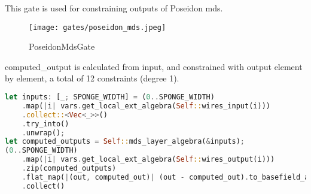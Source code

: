 
\hspace*{\fill}

\indent This gate is used for constraining outputs of Poseidon mds.

\begin{figure}[!ht]
    \centering
    \texttt{[image: gates/poseidon\_mds.jpeg]}
    \caption{PoseidonMdsGate}
    \label{fig:poseidon-mds}
\end{figure}

computed\_output is calculated from input, and constrained with output element by element, a total of 12 constraints (degree 1).
\begin{lstlisting}[language=rust]
let inputs: [_; SPONGE_WIDTH] = (0..SPONGE_WIDTH)
    .map(|i| vars.get_local_ext_algebra(Self::wires_input(i)))
    .collect::<Vec<_>>()
    .try_into()
    .unwrap();
let computed_outputs = Self::mds_layer_algebra(&inputs);
(0..SPONGE_WIDTH)
    .map(|i| vars.get_local_ext_algebra(Self::wires_output(i)))
    .zip(computed_outputs)
    .flat_map(|(out, computed_out)| (out - computed_out).to_basefield_array())
    .collect()
\end{lstlisting}
